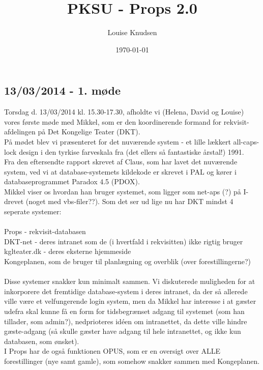 \documentclass[12pt]{article}
\title{PKSU - Props 2.0}
\author{Louise Knudsen}
\date{\today}
\begin{document}
\maketitle
\subsection*{13/03/2014 - 1. møde}
Torsdag d. 13/03/2014 kl. 15.30-17.30, afholdte vi (Helena, David og Louise) vores første møde med Mikkel, som er den koordinerende formand for rekvisit-afdelingen på Det Kongelige Teater (DKT). \\
På mødet blev vi præsenteret for det nuværende system - et lille lækkert all-caps-lock design i den tyrkise farveskala fra (det ellers så fantastiske årstal!) 1991. \\
Fra den eftersendte rapport skrevet af Claus, som har lavet det nuværende system, ved vi at database-systemets kildekode er skrevet i PAL og kører i databaseprogrammet Paradox 4.5 (PDOX). \\
Mikkel viser os hvordan han bruger systemet, som ligger som net-aps (?) på I-drevet (noget med vbs-filer??). Som det ser ud lige nu har DKT mindst 4 seperate systemer: \\\\
Props - rekvisit-databasen \\
DKT-net - deres intranet som de (i hvertfald i rekvisitten) ikke rigtig bruger \\
kglteater.dk - deres eksterne hjemmeside\\
Kongeplanen, som de bruger til planlægning og overblik (over forestillingerne?) \\\\
Disse systemer snakker kun minimalt sammen. Vi diskuterede muligheden for at inkorporere det fremtidige database-system i deres intranet, da der så allerede ville være et velfungerende login system, men da Mikkel har interesse i at gæster udefra skal kunne få en form for tidsbegrænset adgang til systemet (som han tillader, som admin?), nedprioteres idéen om intranettet, da dette ville hindre gæste-adgang (så skulle gæster have adgang til hele intranettet, og ikke kun databasen, som ønsket). \\
I Props har de også funktionen OPUS, som er en oversigt over ALLE forestillinger (nye samt gamle), som somehow snakker sammen med Kongeplanen.
\end{document}
